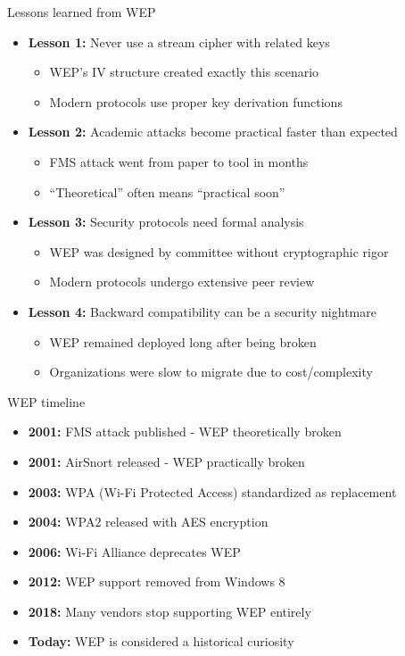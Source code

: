 \documentclass[aspectratio=169, lualatex, handout]{beamer}
\begin{document}
\begin{frame}{Lessons learned from WEP}
	\begin{itemize}[<+->]
		\item \textbf{Lesson 1:} Never use a stream cipher with related keys
		      \begin{itemize}[<+->]
			      \item WEP's IV structure created exactly this scenario
			      \item Modern protocols use proper key derivation functions
		      \end{itemize}
		\item \textbf{Lesson 2:} Academic attacks become practical faster than expected
		      \begin{itemize}[<+->]
			      \item FMS attack went from paper to tool in months
			      \item ``Theoretical'' often means ``practical soon''
		      \end{itemize}
		\item \textbf{Lesson 3:} Security protocols need formal analysis
		      \begin{itemize}[<+->]
			      \item WEP was designed by committee without cryptographic rigor
			      \item Modern protocols undergo extensive peer review
		      \end{itemize}
		\item \textbf{Lesson 4:} Backward compatibility can be a security nightmare
		      \begin{itemize}[<+->]
			      \item WEP remained deployed long after being broken
			      \item Organizations were slow to migrate due to cost/complexity
		      \end{itemize}
	\end{itemize}
\end{frame}

\begin{frame}{WEP timeline}
	\begin{itemize}[<+->]
		\item \textbf{2001:} FMS attack published - WEP theoretically broken
		\item \textbf{2001:} AirSnort released - WEP practically broken
		\item \textbf{2003:} WPA (Wi-Fi Protected Access) standardized as replacement
		\item \textbf{2004:} WPA2 released with AES encryption
		\item \textbf{2006:} Wi-Fi Alliance deprecates WEP
		\item \textbf{2012:} WEP support removed from Windows 8
		\item \textbf{2018:} Many vendors stop supporting WEP entirely
		\item \textbf{Today:} WEP is considered a historical curiosity
	\end{itemize}
\end{frame}
\end{document}
